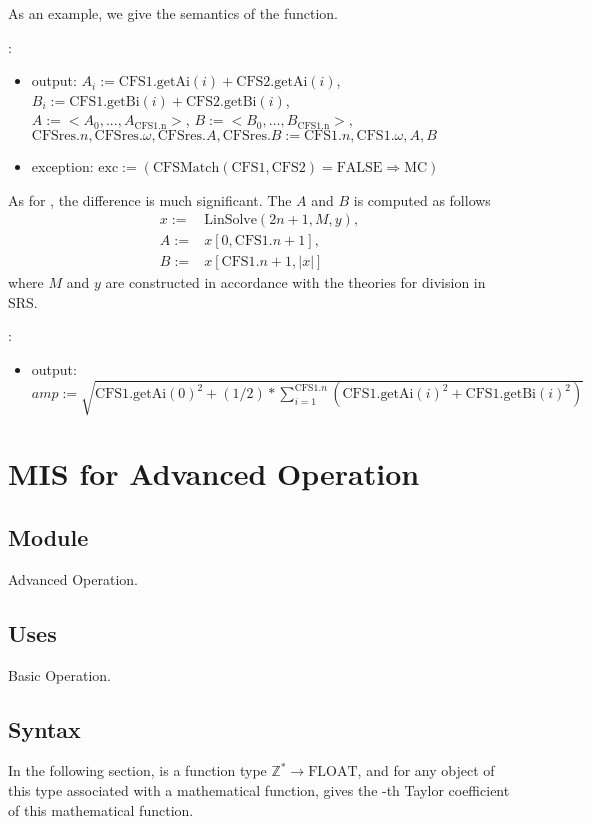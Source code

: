 \documentclass[12pt, titlepage]{article}
\begin{document}
As an example, we give the semantics of the  function.

\noindent {}:
\begin{itemize}
	\item output: $A_i:=\text{CFS1}.\text{getAi}(i)+\text{CFS2}.\text{getAi}(i)$,
	$B_i:=\text{CFS1}.\text{getBi}(i)+\text{CFS2}.\text{getBi}(i)$,\\
	$A:=<A_0, ..., A_{\text{CFS1.n}}>$, $B:=<B_0, ..., B_{\text{CFS1.n}}>$,\\
	$\text{CFSres}.n, \text{CFSres}.\omega, \text{CFSres}.A, \text{CFSres}.B:=\text{CFS1}.n, \text{CFS1}.\omega, A, B$
	\item exception: $\text{exc}:=(\text{CFSMatch}(\text{CFS1}, \text{CFS2})=\text{FALSE}\Rightarrow\text{MC})$
\end{itemize}

As for , the difference is much significant. The $A$ and $B$ is computed as follows
\begin{align*}
	x:=&\text{LinSolve}(2n+1, M, y),\\
	A:=&x[0,\text{CFS1}.n+1],\\
	B:=&x[\text{CFS1}.n+1, |x|]
\end{align*}
where $M$ and $y$ are constructed in accordance with the theories for division in SRS.

\noindent {}:
\begin{itemize} 
	\item output: $amp:=\sqrt{\text{CFS1}.\text{getAi}(0)^2+(1/2)*\sum_{i=1}^{\text{CFS1}.n}(\text{CFS1}.\text{getAi}(i)^2+\text{CFS1}.\text{getBi}(i)^2)}$ 
\end{itemize}

\section{MIS for Advanced Operation}
\subsection{Module}
Advanced Operation.
\subsection{Uses}
Basic Operation.
\subsection{Syntax}
In the following section,  is a function type $\mathbb{Z}^{*}\rightarrow\text{FLOAT}$, and for any object  of this type associated with a mathematical function,  gives the -th Taylor coefficient of this mathematical function.
\end{document}
